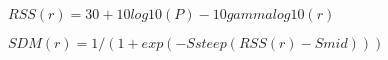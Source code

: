 \documentclass{article}
\begin{document}
$ RSS(r) = 30 + 10 log10(P) - 10 gamma log10(r)$
\pagebreak

$ SDM(r) = 1/(1 + exp (-Ssteep ( RSS(r) - Smid)))$
\pagebreak
\end{document}
